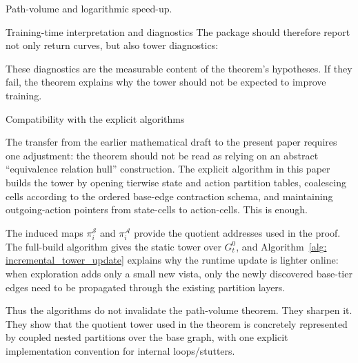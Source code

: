 \documentclass[11pt]{article}
\newcommand{\PVol}{\mathcal{P}\text{-}\mathrm{Vol}}
\begin{document}
\begin{section}{Path-volume and logarithmic speed-up.}
\begin{subsection}{Training-time interpretation and diagnostics}
The package should therefore report not only return curves, but also tower diagnostics:
\noindent
These diagnostics are the measurable content of the theorem's hypotheses. If they fail, the theorem explains why the tower should not be expected to improve training.

\end{subsection}

\begin{subsection}{Compatibility with the explicit algorithms}

The transfer from the earlier mathematical draft to the present paper requires one adjustment: the theorem should not be read as relying on an abstract ``equivalence relation hull'' construction. The explicit algorithm in this paper builds the tower by opening tierwise state and action partition tables, coalescing cells according to the ordered base-edge contraction schema, and maintaining outgoing-action pointers from state-cells to action-cells. This is enough.

The induced maps
$
\pi_i^{\mathcal S}
$
and
$
\pi_i^{\mathcal A}
$
provide the quotient addresses used in the proof. The full-build algorithm gives the static tower over $G_t^0$, and Algorithm~\ref{alg: incremental_tower_update} explains why the runtime update is lighter online: when exploration adds only a small new vista, only the newly discovered base-tier edges need to be propagated through the existing partition layers.

Thus the algorithms do not invalidate the path-volume theorem. They sharpen it. They show that the quotient tower used in the theorem is concretely represented by coupled nested partitions over the base graph, with one explicit implementation convention for internal loops/stutters.

\end{subsection}
\end{section}





\end{document}
